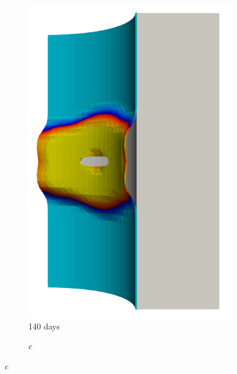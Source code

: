\begin{figure}[!htb]
\begin{subfigure}[b]{0.2\textwidth}
    \includegraphics[width=\textwidth]{Chapter5/figures/spallation/seed_c_4}
    \caption{140 days}
  \end{subfigure}
  \begin{subfigure}[b]{0.1\textwidth}
    \centering
    \caption*{$c$}

\end{subfigure}
\end{figure}
